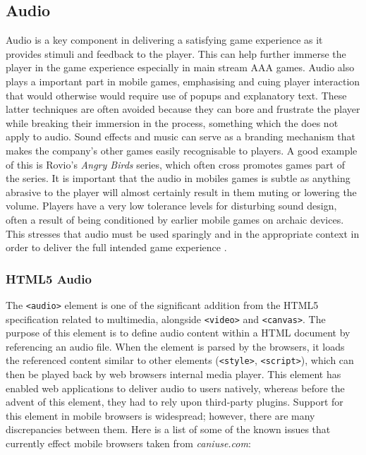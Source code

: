 \documentclass[final]{cmpreport}
\begin{document}
\subsection{Audio}
 Audio is a key component in delivering a satisfying game experience as it provides stimuli and feedback to the player. This can help further immerse the player in the game experience especially in main stream AAA games. Audio also plays a important part in mobile games, emphasising and cuing player interaction that would otherwise would require use of popups and explanatory text. These latter techniques are often avoided because they can bore and frustrate the player while breaking their immersion in the process, something which the does not apply to audio. Sound effects and music can serve as a branding mechanism that makes the company's other games easily recognisable to players. A good example of this is Rovio's \textit{Angry Birds} series, which often cross promotes games part of the series. It is important that the audio in mobiles games is subtle as anything abrasive to the player will almost certainly result in them muting or lowering the volume. Players have a very low tolerance levels for disturbing sound design, often a result of being conditioned by earlier mobile games on archaic devices. This stresses that audio must be used sparingly and in the appropriate context in order to deliver the full intended game experience \citep{Thomas}.

\subsubsection{HTML5 Audio}

The \texttt{<audio>} element is one of the significant addition from the HTML5 specification related to multimedia, alongside \texttt{<video>} and \texttt{<canvas>}. The purpose of this element is to define audio content within a HTML document by referencing an audio file. When the element is parsed by the browsers, it loads the referenced content similar to other elements (\texttt{<style>}, \texttt{<script>}), which can then be played back by web browsers internal media player. This element has enabled web applications to deliver audio to users natively, whereas before the advent of this element, they had to rely upon third-party plugins. Support for this element in mobile browsers is widespread; however, there are many discrepancies between them. Here is a list of some of the known issues that currently effect mobile browsers taken from \textit{caniuse.com}\footnotemark[17]:
\end{document}
